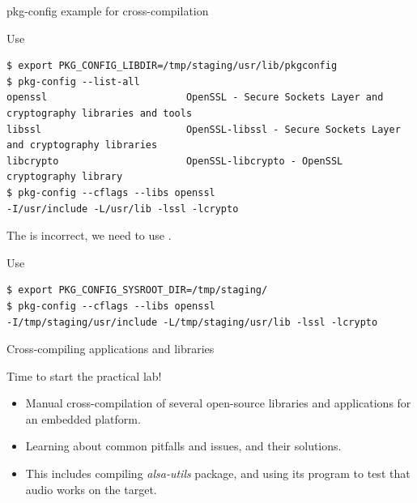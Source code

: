 \begin{frame}[fragile]{pkg-config example for cross-compilation}
  \begin{block}{Use }
    {\scriptsize
\begin{verbatim}
$ export PKG_CONFIG_LIBDIR=/tmp/staging/usr/lib/pkgconfig
$ pkg-config --list-all
openssl                        OpenSSL - Secure Sockets Layer and cryptography libraries and tools
libssl                         OpenSSL-libssl - Secure Sockets Layer and cryptography libraries
libcrypto                      OpenSSL-libcrypto - OpenSSL cryptography library
$ pkg-config --cflags --libs openssl
-I/usr/include -L/usr/lib -lssl -lcrypto
\end{verbatim}
    }
  \end{block}

  The  is incorrect, we need to use
  .

  \begin{block}{Use }
    {\scriptsize
\begin{verbatim}
$ export PKG_CONFIG_SYSROOT_DIR=/tmp/staging/
$ pkg-config --cflags --libs openssl
-I/tmp/staging/usr/include -L/tmp/staging/usr/lib -lssl -lcrypto
\end{verbatim}
    }
  \end{block}
\end{frame}

\setuplabframe
{Cross-compiling applications and libraries}
{
  Time to start the practical lab!
  \begin{itemize}
  \item Manual cross-compilation of several open-source libraries and
    applications for an embedded platform.
  \item Learning about common pitfalls and issues, and their
    solutions.
  \item This includes compiling {\em alsa-utils} package,
    and using its  program to test that
    audio works on the target.
  \end{itemize}
}
